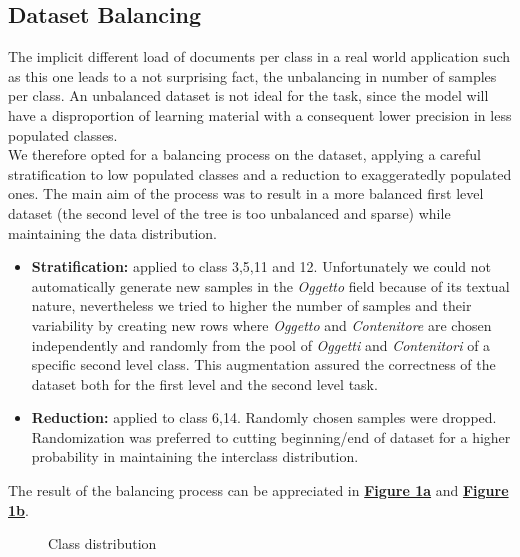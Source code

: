 \documentclass[12pt]{article}
\begin{document}
\subsection{Dataset Balancing} \label{sec:dataset-balancing}
The implicit different load of documents per class in a real world application such as this one leads to a not surprising fact, the unbalancing in number of samples per class. An unbalanced dataset is not ideal for the task, since the model will have a disproportion of learning material with a consequent lower precision in less populated classes. \\We therefore opted for a balancing process on the dataset, applying a careful stratification to low populated classes and a reduction to exaggeratedly populated ones. The main aim of the process was to result in a more balanced first level dataset (the second level of the tree is too unbalanced and sparse) while maintaining the data distribution. 
\begin{itemize}
    \item \textbf{Stratification:} applied to class 3,5,11 and 12. Unfortunately we could not automatically generate new samples in the \textit{Oggetto} field because of its textual nature, nevertheless we tried to higher the number of samples and their variability by creating new rows where \textit{Oggetto} and \textit{Contenitore} are chosen independently and randomly from the pool of \textit{Oggetti} and \textit{Contenitori} of a specific second level class. This augmentation assured the correctness of the dataset both for the first level and the second level task. 
    \item \textbf{Reduction:} applied to class 6,14. Randomly chosen samples were dropped. Randomization was preferred to cutting beginning/end of dataset for a higher probability in maintaining the interclass distribution.
\end{itemize}
The result of the balancing process can be appreciated in \hyperref[fig:before]{\textbf{Figure 1a}} and \hyperref[fig:after]{\textbf{Figure 1b}}.
\begin{figure}[!tbp]
  \centering
  \hfill
\caption{Class distribution}
\end{figure}
\end{document}
